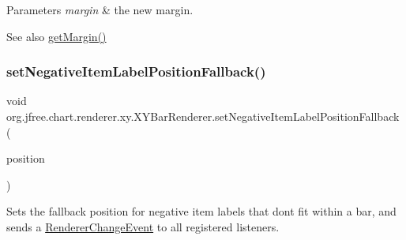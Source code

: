 \begin{DoxyParams}{Parameters}
{\em margin} & the new margin.\\
\hline
\end{DoxyParams}
\begin{DoxySeeAlso}{See also}
\mbox{\hyperlink{classorg_1_1jfree_1_1chart_1_1renderer_1_1xy_1_1_x_y_bar_renderer_afe1667467a6b42816f9a3bad2373e3b7}{get\+Margin()}} 
\end{DoxySeeAlso}
\mbox{\label{classorg_1_1jfree_1_1chart_1_1renderer_1_1xy_1_1_x_y_bar_renderer_ae75032392dda175fb9440309d6d84c9a}} 
\subsubsection{\texorpdfstring{set\+Negative\+Item\+Label\+Position\+Fallback()}{setNegativeItemLabelPositionFallback()}}
{\footnotesize\ttfamily void org.\+jfree.\+chart.\+renderer.\+xy.\+X\+Y\+Bar\+Renderer.\+set\+Negative\+Item\+Label\+Position\+Fallback (\begin{DoxyParamCaption}\item[{\mbox{\hyperlink{classorg_1_1jfree_1_1chart_1_1labels_1_1_item_label_position}{Item\+Label\+Position}}}]{position }\end{DoxyParamCaption})}

Sets the fallback position for negative item labels that don\textquotesingle{}t fit within a bar, and sends a \mbox{\hyperlink{}{Renderer\+Change\+Event}} to all registered listeners.


